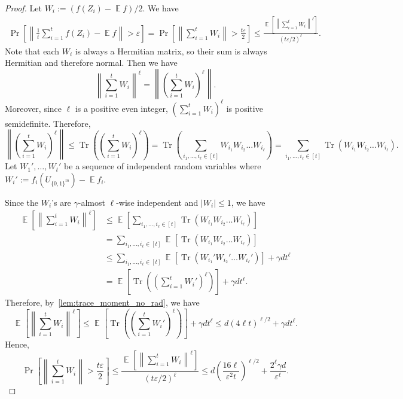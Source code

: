 \documentclass[10pt,a4paper]{article}
\DeclareMathOperator*{\E}{\mathbb{E}}
\DeclareMathOperator*{\Tr}{Tr}
\newcommand{\eps}{\varepsilon}
\newcommand{\1}{\mathbbm{1}}
\newcommand{\norm}[1]{\left\lVert #1\right\rVert}
\newcommand{\tuple}[1]{\left(#1\right)}
\newcommand{\zo}{\{0, 1\}}
\newcommand{\Prb}[2][]{\Pr_{#1}\left[#2\right]}
\newcommand{\Ex}[2][]{\E_{#1}\left[#2\right]}
\begin{document}
\begin{proof}
    Let $W_i := (f(Z_i) - \E f) / 2$. 
    We have
    \begin{align*}
    \Prb{\norm{\frac{1}{t}\sum_{i=1}^t f(Z_i) - \E f} > \eps} = \Prb{\norm{\sum_{i=1}^t W_i} > \frac{t\eps}{2}} \le \frac{\Ex{\norm{\sum_{i=1}^t W_i}^\ell}}{(t\eps / 2)^\ell}. 
\end{align*}
Note that each $W_i$ is always a Hermitian matrix, so their sum is always Hermitian and therefore normal. Then we have \[
    \norm{\sum_{i=1}^t W_i}^\ell = \norm{\tuple{\sum_{i=1}^t W_i}^\ell}.
\]
Moreover, since $\ell$ is a positive even integer, $(\sum_{i=1}^t W_i)^\ell$ is positive semidefinite. Therefore, \[
\norm{\tuple{\sum_{i=1}^t W_i}^\ell} \le \Tr \tuple{\tuple{\sum_{i=1}^t W_i}^\ell} =
\Tr\tuple{\sum_{i_1, \dots, i_\ell \in [t]} W_{i_1} W_{i_2} \dots W_{i_\ell}} =
\sum_{i_1, \dots, i_\ell \in [t]} \Tr\tuple{  W_{i_1} W_{i_2} \dots W_{i_\ell}}.
\] 
 Let $W_1', \dots, W_t'$ be a sequence of independent random variables where $W_i' := f_i(U_{\zo^m}) - \E f_i$. 
 
 
 
 
 Since the $W_i$'s are $\gamma$-almost $\ell$-wise independent and $|W_i| \le 1$, we have 
 \begin{align*}
    \Ex{\norm{\sum_{i=1}^t W_i}^\ell} &\le \Ex{\sum_{i_1, \dots, i_\ell \in [t]} \Tr\tuple{  W_{i_1} W_{i_2} \dots W_{i_\ell}}} \\
    &= \sum_{i_1, \dots, i_\ell \in [t]} \Ex{\Tr\tuple{  W_{i_1} W_{i_2} \dots W_{i_\ell}}} \\
    &\le \sum_{i_1, \dots, i_\ell \in [t]} \Ex{\Tr\tuple{  W_{i_1}' W_{i_2}' \dots W_{i_\ell}'}} + \gamma d t^\ell \\
    &= \Ex{\Tr \tuple{\tuple{\sum_{i=1}^t W_i'}^\ell}} + \gamma d t^\ell.
 \end{align*}
Therefore, by~\cref{lem:trace_moment_no_rad}, we have \[
    \Ex{\norm{\sum_{i=1}^t W_i}^\ell} \le \Ex{\Tr \tuple{\tuple{\sum_{i=1}^t W_i'}^\ell}} + \gamma d t^\ell \le 
    d \left(4 \ell t\right)^{ {\ell}/{2}} + \gamma d t^\ell.
\]
Hence, \[
 \Prb{\norm{\sum_{i=1}^t W_i} > \frac{t\eps}{2}}  \le \frac{\Ex{\norm{\sum_{i=1}^t W_i}^\ell}}{(t\eps / 2)^\ell} \le d \left( \frac{16\ell}{\eps^2 t} \right)^{\ell/2} + \frac{2^\ell \gamma d}{\eps^\ell}.
\]
\end{proof}
\end{document}

